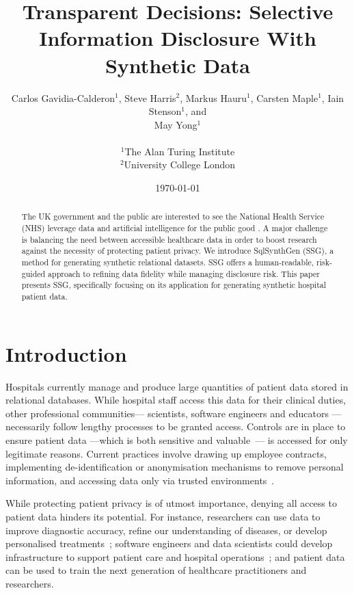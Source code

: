 \documentclass[11pt]{article}
\begin{document}
\title{Transparent Decisions: Selective Information Disclosure With Synthetic Data}
\author{
Carlos Gavidia-Calderon$^1$, Steve Harris$^2$, Markus Hauru$^1$, Carsten Maple$^1$, Iain Stenson$^1$, and \\ May Yong$^1$ \\~\\
$^1$The Alan Turing Institute \\
$^2$University College London
}
\date{\today} %
\maketitle
\begin{abstract}
The UK government and the public are interested to see the National Health Service (NHS) leverage data and artificial intelligence for the public good \cite{gov2022datasaves}\cite{Jones2022}. A major challenge is balancing the need between accessible healthcare data in order to boost research against the necessity of protecting patient privacy. We introduce SqlSynthGen (SSG), a method for generating synthetic relational datasets. SSG offers a human-readable, risk-guided approach to refining data fidelity while managing disclosure risk. This paper presents SSG, specifically focusing on its application for generating synthetic hospital patient data.
\end{abstract}

\section{Introduction}

Hospitals currently manage and produce large quantities of
patient data stored in relational databases. While hospital staff access this data for their clinical duties, other professional communities--- scientists, software engineers and educators --- necessarily follow lengthy processes to be granted access. Controls are in place to ensure patient data ---which is both sensitive and valuable~\cite{schomerus2022}--- is accessed for only legitimate reasons. Current practices involve drawing up employee contracts, implementing de-identification or anonymisation mechanisms to remove personal information, and accessing data only via trusted environments~\cite{harris2022}.

While protecting patient privacy is of utmost importance, denying all access to patient data hinders its potential. For instance, researchers can use data to improve diagnostic accuracy, refine our understanding of diseases, or develop personalised treatments~\cite{tucker2020}; software engineers and data scientists could develop infrastructure to support patient care and hospital operations~\cite{harris2022}; and patient data can be used to train the next generation of healthcare practitioners and researchers.
\end{document}
